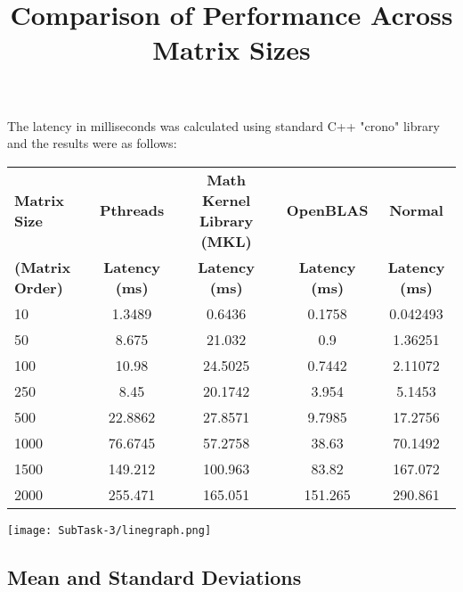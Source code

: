 \documentclass[10pt,a4paper,titlepage]{article}
\begin{document}
The latency in milliseconds was calculated using standard C++ "crono" library and the results were as follows:

\newpage


\begin{center}
\title{\begin{Large}
Comparison of Performance Across Matrix Sizes
\end{Large}}
\newline
\newline

\begin{tabular}{l|c|c|c|c}
\textbf{Matrix Size} & \textbf{Pthreads} & \textbf{Math Kernel Library (MKL)} &  \textbf{OpenBLAS} &  \textbf{Normal}\\
\textbf{(Matrix Order)} & \textbf{Latency (ms)} & \textbf{Latency (ms)} & \textbf{Latency (ms)} & \textbf{Latency (ms)}\\
\hline
10 & 1.3489 & 0.6436 & 0.1758 & 0.042493\\
50 & 8.675 & 21.032 & 0.9 & 1.36251\\
100 & 10.98 & 24.5025 & 0.7442 & 2.11072\\
250 & 8.45 & 20.1742 & 3.954 & 5.1453\\
500 & 22.8862 & 27.8571 & 9.7985 & 17.2756\\
1000 & 76.6745 & 57.2758 & 38.63 & 70.1492\\
1500 & 149.212 & 100.963 & 83.82 & 167.072\\
2000 & 255.471 & 165.051 & 151.265 & 290.861\\
\end{tabular}

\texttt{[image: SubTask-3/linegraph.png]} 
\newline
\newline
\end{center}

\subsection{Mean and Standard Deviations}
\end{document}
